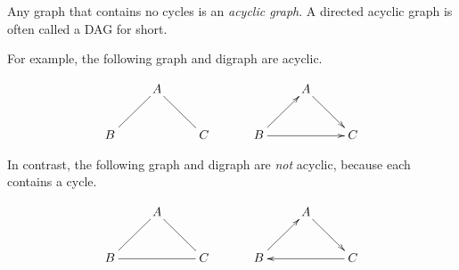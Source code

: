 \documentclass[12pt]{article}
\begin{document}
Any graph that contains no cycles is an \emph{acyclic graph}.  A directed acyclic graph is often called a DAG for short.

For example, the following graph and digraph are acyclic.

$$
\begin{array}{cc}
\xymatrix{&A\ar@{-}[dl]\ar@{-}[dr]\\B&&C}
\quad
&
\quad
\xymatrix{&A\ar[dr]\\B\ar[ur]\ar[rr]&&C}
\end{array}
$$

In contrast, the following graph and digraph are \emph{not} acyclic, because
each contains a cycle.

$$
\begin{array}{cc}
\xymatrix{&A\ar@{-}[dl]\ar@{-}[dr]\\B\ar@{-}[rr]&&C}
\quad
&
\quad
\xymatrix{&A\ar[dr]\\B\ar[ur]&&C\ar[ll]}
\end{array}
$$
\end{document}
